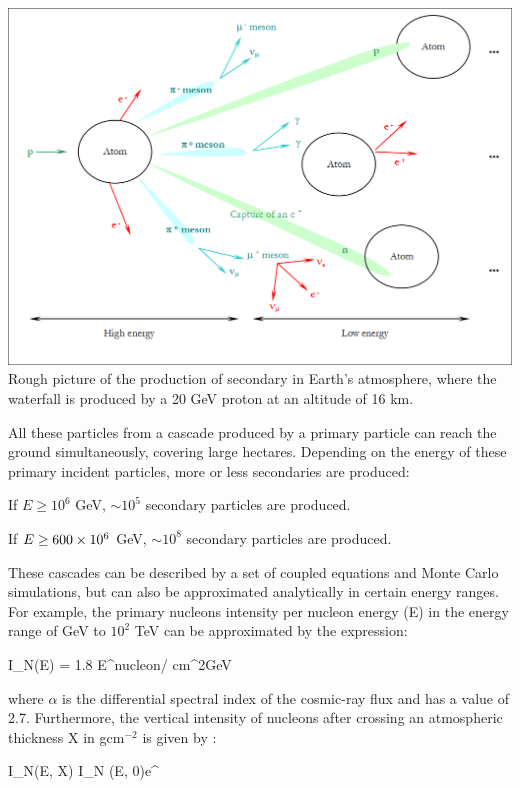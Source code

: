     \bfi[H]
      \bc
      \includegraphics[width=14cm]{img/cascades.png}\\[12pt]
      \caption[Production of secondaries in Earth's atmosphere.]{Rough picture of the production of secondary in Earth's atmosphere, where the waterfall is produced by a 20 GeV proton at an altitude of 16 km.}\label{fig:cascades}
      \ec
    \efi


	All these particles from a cascade produced by a primary particle can reach the ground simultaneously, covering large hectares. Depending on the energy of these primary incident particles, more or less secondaries are produced:

	\bi
		\item If $E \geq 10^6$ GeV, $\sim 10^5$ secondary particles  are produced.
		\item If $E \geq 600\times 10^{6}$ GeV, $\sim 10^8$ secondary particles are produced.
	\ei

These cascades can be described by a set of coupled equations and Monte Carlo simulations, but can also be approximated analytically in certain energy ranges. For example, the primary nucleons intensity per nucleon energy (E) in the energy range of GeV to $10^2$ TeV can be approximated by the expression:

	\be\label{eq:in} I_N(E) = 1.8 E^\alpha nucleon/ cm^2GeV\ee


where $\alpha$ is the differential spectral index of the cosmic-ray flux and has a value of 2.7.
Furthermore, the vertical intensity of nucleons after crossing an atmospheric thickness X in gcm$^{-2}$ is given by \cite{eid:04}:

	\be\label{eq:in2} I_N(E, X) \approx I_N (E, 0)e^{} \ee

